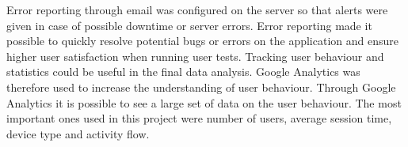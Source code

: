Error reporting through email was configured on the server so that alerts were given in case of possible downtime or server errors. Error reporting made it possible to quickly resolve potential bugs or errors on the application and ensure higher user satisfaction when running user tests. Tracking user behaviour and statistics could be useful in the final data analysis. Google Analytics was therefore used to increase the understanding of user behaviour. Through Google Analytics it is possible to see a large set of data on the user behaviour. The most important ones used in this project were number of users, average session time, device type and activity flow.  

\cleardoublepage